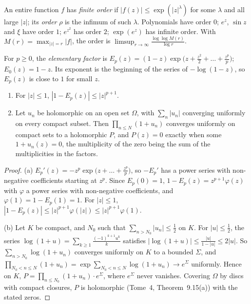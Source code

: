 An entire function $f$ has \emph{finite order} if $|f(z)|\le\exp(|z|^\lambda)$ for some $\lambda$ and all large $|z|$; its \emph{order} $\rho$ is the infimum of such $\lambda$. Polynomials have order $0$; $e^z$, $\sin z$
and $\xi$ have order $1$; $e^{z^2}$ has order $2$; $\exp(e^z)$ has infinite order. With $M(r)=\max_{|z|=r}|f|$, the order is $\limsup_{r\to\infty}\frac{\log\log M(r)}{\log r}$.

For $p\ge0$, the \emph{elementary factor} is $E_p(z)=(1-z)\exp\bigl(z+\frac{z^2}2+\dots+\frac{z^p}p\bigr)$; $E_0(z)=1-z$. Its exponent is the beginning of the series of $-\log(1-z)$, so $E_p(z)$ is close to $1$
for small $z$.

\begin{lemma}\label{lem:products}
\begin{enumerate}
\item[(a)] For $|z|\le1$, $|1-E_p(z)|\le|z|^{p+1}$.
\item[(b)] Let $u_n$ be holomorphic on an open set $\Omega$, with $\sum_n|u_n|$ converging uniformly on every compact subset. Then $\prod_{n\le N}(1+u_n)$ converges uniformly on compact sets to a holomorphic
$P$, and $P(z)=0$ exactly when some $1+u_n(z)=0$, the multiplicity of the zero being the sum of the multiplicities in the factors.
\end{enumerate}
\end{lemma}
\begin{proof}
(a) $E_p'(z)=-z^p\exp\bigl(z+\dots+\frac{z^p}p\bigr)$, so $-E_p'$ has a power series with non-negative coefficients starting at $z^p$. Since $E_p(0)=1$, $1-E_p(z)=z^{p+1}\varphi(z)$ with $\varphi$ a power series
with non-negative coefficients, and $\varphi(1)=1-E_p(1)=1$. For $|z|\le1$, $|1-E_p(z)|\le|z|^{p+1}\varphi(|z|)\le|z|^{p+1}\varphi(1)$.

(b) Let $K$ be compact, and $N_0$ such that $\sum_{n>N_0}|u_n|\le\frac12$ on $K$. For $|u|\le\frac12$, the series $\log(1+u)=\sum_{k\ge1}\frac{(-1)^{k+1}u^k}k$ satisfies $|\log(1+u)|\le\frac{|u|}{1-|u|}\le2|u|$. So
$\sum_{n>N_0}\log(1+u_n)$ converges uniformly on $K$ to a bounded $\Sigma$, and $\prod_{N_0<n\le N}(1+u_n)=\exp\sum_{N_0<n\le N}\log(1+u_n)\to e^\Sigma$ uniformly. Hence on $K$, $P=\prod_{n\le N_0}(1+u_n)\cdot e^\Sigma$, where
$e^\Sigma$ never vanishes. Covering $\Omega$ by discs with compact closures, $P$ is holomorphic (Tome~4, Theorem~9.15(a)) with the stated zeros.
\end{proof}

